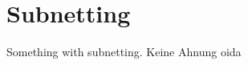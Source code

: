 \chapter{Subnetting}

\thispagestyle{standard}
\pagestyle{standard}

Something with subnetting. Keine Ahnung oida

